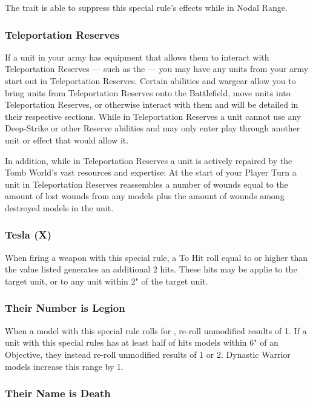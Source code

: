 \begin{multicols}{2}
The  trait is able to suppress this special rule's effects while in Nodal Range.


\subsubsection{Teleportation Reserves} \label{Teleportation Reserves}

If a unit in your army has equipment that allows them to interact with Teleportation Reserves — such as the  — you may have any units from your army start out in Teleportation Reserves. Certain abilities and wargear allow you to bring units from Teleportation Reserves onto the Battlefield, move units into Teleportation Reserves, or otherwise interact with them and will be detailed in their respective sections. While in Teleportation Reserves a unit cannot use any Deep-Strike or other Reserve abilities and may only enter play through another unit or effect that would allow it.

In addition, while in Teleportation Reserves a unit is actively repaired by the Tomb World's vast resources and expertise: At the start of your Player Turn a unit in Teleportation Reserves reassembles a number of wounds equal to the amount of lost wounds from any models plus the amount of wounds among destroyed models in the unit.

\subsubsection{Tesla (X)} \label{Tesla}

When firing a weapon with this special rule, a To Hit roll equal to or higher than the value listed generates an additional 2 hits. These hits may be applie to the target unit, or to any unit within 2" of the target unit.

\subsubsection{Their Number is Legion} \label{Their Number is Legion}

When a model with this special rule rolls for , re-roll unmodified results of 1. If a unit with this special rules has at least half of hits models within 6" of an Objective, they instead re-roll unmodified results of 1 or 2. Dynastic Warrior models increase this range by 1.

\subsubsection{Their Name is Death} \label{Their Name is Death}


\end{multicols}
